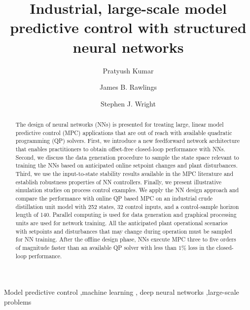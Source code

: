 \documentclass[preprint,5p, twocolumn, authoryear]{elsarticle}
\begin{document}
\begin{frontmatter}


\title{Industrial, large-scale model predictive control 
with structured neural networks}

\author[label1]{Pratyush Kumar}

\author[label1]{James B. Rawlings}

\author[label2]{Stephen J. Wright}

\address[label1]{Department of Chemical Engineering, University of California, Santa Barbara, CA 93106, United States}
\address[label2]{Computer Sciences Department, University of Wisconsin-Madison, Madison, WI 53706, United States}

\begin{abstract}
The design of neural networks (NNs) is presented for treating large, linear
model predictive control (MPC) applications that are out of reach with available
quadratic programming (QP) solvers. First, we introduce a new feedforward
network architecture that enables practitioners to obtain offset-free
closed-loop performance with NNs. Second, we discuss the data generation
procedure to sample the state space relevant to training the NNs based on
anticipated online setpoint changes and plant disturbances. Third, we use the
input-to-state stability results available in the MPC literature and establish
robustness properties of NN controllers. Finally, we present illustrative
simulation studies on process control examples. We apply the NN design approach
and compare the performance with online QP based MPC on an industrial crude
distillation unit model with 252 states, 32 control inputs, and a control-sample
horizon length of 140. Parallel computing is used for data generation and
graphical processing units are used for network training. All the anticipated
plant operational scenarios with setpoints and disturbances that may change
during operation must be sampled for NN training. After the offline design
phase, NNs execute MPC three to five orders of magnitude faster than an
available QP solver with less than $1\%$ loss in the closed-loop performance.
\end{abstract}

\begin{keyword}
Model predictive control \sep machine learning \sep 
deep neural networks \sep large-scale problems
\end{keyword}

\end{frontmatter}
\end{document}
